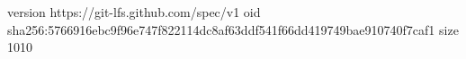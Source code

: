 version https://git-lfs.github.com/spec/v1
oid sha256:5766916ebc9f96e747f822114dc8af63ddf541f66dd419749bae910740f7caf1
size 1010
